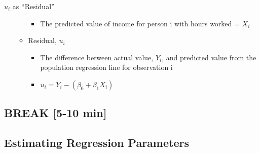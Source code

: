 \documentclass[
  8pt,
  ignorenonframetext,
  dvipsnames]{beamer}
\providecommand{\tightlist}{%
  \setlength{\itemsep}{0pt}\setlength{\parskip}{0pt}}
\let\olditem\item
\renewcommand{\item}{%
  \olditem\vspace{4pt}
}
\begin{document}
\begin{frame}{\(u_i\) as ``Residual''}
\begin{itemize}
\begin{itemize}
    \begin{itemize}
    \tightlist
    \item
      The predicted value of income for person i with hours worked =
      \(X_i\)
    \end{itemize}
  \item
    Residual, \(u_i\)

    \begin{itemize}
    \tightlist
    \item
      The difference between actual value, \(Y_i\), and predicted value
      from the population regression line for observation i
    \item
      \(u_i = Y_i - (\beta_0 + \beta_1X_i)\)
    \end{itemize}
  \end{itemize}
\end{itemize}

\end{frame}

\hypertarget{break-5-10-min}{%
\subsection{BREAK {[}5-10 min{]}}\label{break-5-10-min}}

\hypertarget{estimating-regression-parameters}{%
\subsection{Estimating Regression
Parameters}\label{estimating-regression-parameters}}
\end{document}
